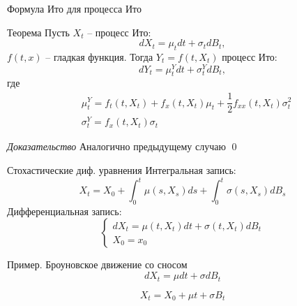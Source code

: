 \documentclass{beamer}
\begin{document}
\begin{frame}{Формула Ито для процесса Ито}
    \begin{block}{Теорема}
    Пусть $X_t$ -- процесс Ито:
    $$
        dX_t = \mu_t dt + \sigma_t dB_t,
    $$ $f(t, x)$ -- гладкая функция. Тогда $Y_t = f(t, X_t)$ процесс Ито:
    $$
        dY_t = \mu^Y_t dt + \sigma^Y_t dB_t,
    $$где 
    \begin{align*}
        &\mu^Y_t = f_t(t, X_t) + f_x(t, X_t) \mu_t + \dfrac{1}{2} f_{xx}(t, X_t) \sigma_t^2 \\
        &\sigma_t^Y = f_x(t, X_t) \sigma_t 
    \end{align*}
     \end{block}
    \textit{Доказательство} Аналогично предыдущему случаю \qed
\end{frame}

\begin{frame}{Стохастические диф. уравнения}
    Интегральная запись:
    $$
        X_t = X_0 + \int_0^t \mu(s, X_s) ds + \int_0^t \sigma(s, X_s) dB_s
    $$
    Дифференциальная запись:
    $$
        \begin{cases}
            d X_t = \mu(t, X_t) dt + \sigma(t, X_t) dB_t \\
            X_0 = x_0
        \end{cases}
    $$
\end{frame}

\begin{frame}{Пример. Броуновское движение со сносом}
    $$
        dX_t = \mu dt + \sigma dB_t 
    $$
     
    $$
        X_t = X_0 + \mu t + \sigma B_t
    $$
    \pause
\end{frame}
\end{document}
